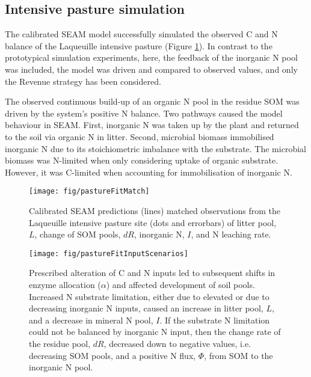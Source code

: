 \subsection{Intensive pasture simulation}
\label{sec:ResultsPasture}

The calibrated SEAM model successfully simulated the observed C and N balance of
the Laqueuille intensive pasture (Figure \ref{fig:pastureFitMatch}). In contrast
to the prototypical simulation experiments, here, the feedback of the inorganic
N pool was included, the model was driven and compared to observed values, and
only the Revenue strategy has been considered.

The observed continuous build-up of an organic N pool in the residue SOM was
driven by the system's positive N balance. Two pathways caused the model
behaviour in SEAM. First, inorganic N was taken up by the plant and returned to
the soil via organic N in litter. Second, microbial biomass immobilised
inorganic N due to its stoichiometric imbalance with the substrate. The
microbial biomass was N-limited when only considering uptake of
organic substrate. However, it was C-limited when accounting for immobilisation
of inorganic N.

\begin{figure}[t] \vspace*{2mm}
\begin{center}
\texttt{[image: fig/pastureFitMatch]} 
\end{center}
\caption{
Calibrated SEAM predictions (lines)  matched observations from the
Laqueuille intensive pasture site (dots and errorbars) of litter pool, $L$, change of
SOM pools, $dR$, inorganic N, $I$, and N leaching rate.
\label{fig:pastureFitMatch}}
\end{figure}

\begin{figure}[t] \vspace*{2mm}
\begin{center}
\texttt{[image: fig/pastureFitInputScenarios]} 
\end{center}
\caption{
Prescribed alteration of C and N inputs led to subsequent shifts in enzyme
allocation ($\alpha$) and affected development of soil pools.
Increased N substrate limitation, either due to elevated  or due to
decreasing inorganic N inputs, caused an increase in litter pool, $L$, and a
decrease in mineral N pool, $I$. If the substrate N limitation could not be
balanced by inorganic N input, then the change rate of the residue pool, $dR$,
decreased down to negative values, i.e. decreasing SOM pools, and a
positive N flux, $\Phi$, from SOM to the inorganic N pool.
\label{fig:pastureFitScen}} 
\end{figure}   
   
